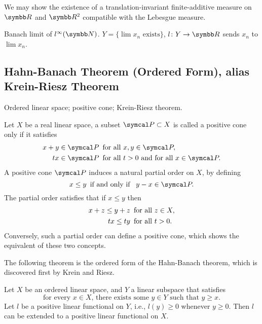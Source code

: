 \begin{example}
  We may show the existence of a translation-invariant finite-additive measure on $\RR$ and $\RR^2$ compatible with the Lebesgue measure.
\end{example}

\begin{example}
  Banach limit of $l^\infty(\NN)$. $Y=\{\lim x_n \text{ exists}\}$, $l\colon Y\to\RR$ sends $x_n$ to $\lim x_n$.
\end{example}

\subsection{Hahn-Banach Theorem (Ordered Form), alias Krein-Riesz Theorem}

Ordered linear space; positive cone; Krein-Riesz theorem.

\begin{definition}
  Let $X$ be a real linear space, a subset $\CONE P\subset X$ is called a positive cone only if it satisfies
  \begin{equation*}
    \begin{aligned}
      x+y\in\CONE P&\text{\enskip for all }x, y\in\CONE P,\\
      tx\in\CONE P&\text{\enskip for all }t>0 \text{ and for all }x\in\CONE P.
    \end{aligned}
  \end{equation*}
  A positive cone $\CONE P$ induces a natural partial order on $X$, by defining
  \begin{equation*}
    x\leq y \text{\enskip if and only if \enskip}y-x\in\CONE P.
  \end{equation*}
  The partial order satisfies that if $x\leq y$ then
  \begin{equation*}
    \begin{aligned}
      x+z\leq y+z&\text{\enskip for all }z\in X,\\
      tx\leq ty&\text{\enskip for all }t>0.
    \end{aligned}
  \end{equation*}
  Conversely, such a partial order can define a positive cone, which shows the equivalent of these two concepts.
\end{definition}

The following theorem is the ordered form of the Hahn-Banach theorem, which is discovered first by Krein and Riesz.

\begin{theorem}
  Let $X$ be an ordered linear space, and $Y$ a linear subspace that satisfies
  \begin{equation*}
    \text{for every }x\in X\text{, there exists some }y\in Y\text{ such that }y\geq x.
  \end{equation*}
  Let $l$ be a positive linear functional on $Y$, i.e., $l(y)\geq 0$ whenever $y\geq 0$. Then $l$ can be extended to a positive linear functional on $X$.
\end{theorem}

